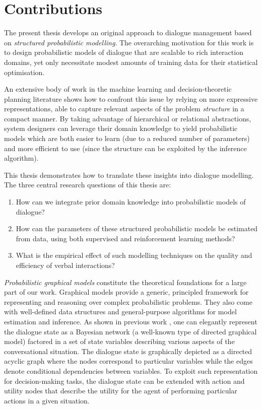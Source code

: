 \section{Contributions}

The present thesis develops an original approach to dialogue management based on \textit{structured probabilistic modelling}.  The overarching motivation for this work is to design probabilistic models of dialogue that are scalable to rich interaction domains, yet only necessitate modest amounts of training data for their statistical optimisation.

An extensive body of work in the machine learning and decision-theoretic planning literature shows how to confront this issue by relying on more expressive representations, able to capture relevant aspects of the problem \textit{structure} in a compact manner. By taking advantage of hierarchical or relational abstractions, system designers can leverage their domain knowledge to yield probabilistic models which are both easier to learn (due to a reduced number of parameters) and more efficient to use (since the structure can be exploited by the inference algorithm).  

This thesis demonstrates how to translate these insights into dialogue modelling.  The three central research questions of this thesis are:
\begin{enumerate}
\item How can we integrate prior domain knowledge into probabilistic models of dialogue?
\item How can the parameters of these structured probabilistic models be estimated from data, using both supervised and reinforcement learning methods?  
\item What is the empirical effect of such modelling techniques on the quality and efficiency of verbal interactions?
\end{enumerate}

\textit{Probabilistic graphical models} \citep{Koller+Friedman:09} constitute the theoretical foundations for a large part of our work.  Graphical models provide a generic, principled framework for representing and reasoning over complex probabilistic problems. They also come with well-defined data structures and general-purpose algorithms for model estimation and inference.  As shown in previous work \citep[see for instance][]{Thomson:2010:BUD:1772996.1773040}, one can elegantly represent the dialogue state as a Bayesian network (a well-known type of directed graphical model) factored in a set of state variables describing various aspects of the conversational situation.  The dialogue state is graphically depicted as a directed acyclic graph where the nodes correspond to particular variables while the edges denote conditional dependencies between variables. To exploit such representation for decision-making tasks, the dialogue state can be extended with action and utility nodes that describe the utility for the agent of performing particular actions in a given situation. 


